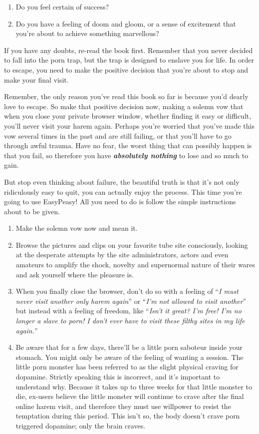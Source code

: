 \documentclass[
]{book}
\begin{document}
\begin{enumerate}
\def\labelenumi{\arabic{enumi}.}
\item
  Do you feel certain of success?
\item
  Do you have a feeling of doom and gloom, or a sense of excitement that you're about to achieve something marvellous?
\end{enumerate}

If you have any doubts, re-read the book first. Remember that you never decided to fall into the porn trap, but the trap is designed to enslave you for life. In order to escape, you need to make the positive decision that you're about to stop and make your final visit.

Remember, the only reason you've read this book so far is because you'd dearly love to escape. So make that positive decision now, making a solemn vow that when you close your private browser window, whether finding it easy or difficult, you'll never visit your harem again. Perhaps you're worried that you've made this vow several times in the past and are still failing, or that you'll have to go through awful trauma. Have no fear, the worst thing that can possibly happen is that you fail, so therefore you have \textbf{\emph{absolutely nothing}} to lose and so much to gain.

But stop even thinking about failure, the beautiful truth is that it's not only ridiculously easy to quit, you can actually enjoy the process. This time you're going to use EasyPeasy! All you need to do is follow the simple instructions about to be given.

\begin{enumerate}
\def\labelenumi{\arabic{enumi}.}
\item
  Make the solemn vow now and mean it.
\item
  Browse the pictures and clips on your favorite tube site consciously, looking at the desperate attempts by the site administrators, actors and even amateurs to amplify the shock, novelty and supernormal nature of their wares and ask yourself where the pleasure is.
\item
  When you finally close the browser, don't do so with a feeling of ``\emph{I must never visit another only harem again}'' or ``\emph{I'm not allowed to visit another}'' but instead with a feeling of freedom, like ``\emph{Isn't it great? I'm free! I'm no longer a slave to porn! I don't ever have to visit these filthy sites in my life again.}''
\item
  Be aware that for a few days, there'll be a little porn saboteur inside your stomach. You might only be aware of the feeling of wanting a session. The little porn monster has been referred to as the slight physical craving for dopamine. Strictly speaking this is incorrect, and it's important to understand why. Because it takes up to three weeks for that little monster to die, ex-users believe the little monster will continue to crave after the final online harem visit, and therefore they must use willpower to resist the temptation during this period. This isn't so, the body doesn't crave porn triggered dopamine; only the brain craves.
\end{enumerate}
\end{document}
